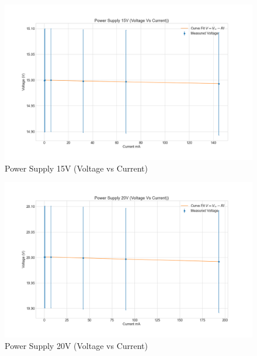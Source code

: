 \documentclass[letterpaper,12pt]{article}
\begin{document}
\begin{figure}[H]
  \centering
  \includegraphics[width=0.95\linewidth]{../code/Fredrik/Power supply 15V lab5_voltage_vs_current.png}    
  \caption{Power Supply 15V (Voltage vs Current)}
  \label{ps-15}
\end{figure}

\begin{figure}[H]
  \centering
  \includegraphics[width=0.95\linewidth]{../code/Fredrik/Power supply 20V lab5_voltage_vs_current.png}    
  \caption{Power Supply 20V (Voltage vs Current)}
  \label{ps-20}
\end{figure}
\end{document}
